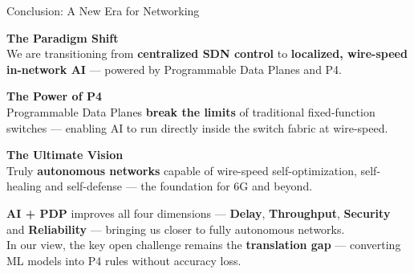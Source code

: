 {
\begin{frame}{Conclusion: A New Era for Networking}
  \vspace{6pt}

  \begin{tcolorbox}[problemcard=HUAdark]
    {\color{HUAdark}\bfseries\small The Paradigm Shift}
    \vspace{3pt}\\
    {\footnotesize\color{HUAdark}
      We are transitioning from \textbf{centralized SDN control}
      to \textbf{localized, wire-speed in-network AI} ---
      powered by Programmable Data Planes and P4.}
  \end{tcolorbox}

  \vspace{6pt}

  \begin{tcolorbox}[problemcard=HUAdark]
    {\color{HUAdark}\bfseries\small The Power of P4}
    \vspace{3pt}\\
    {\footnotesize\color{HUAdark}
      Programmable Data Planes \textbf{break the limits}
      of traditional fixed-function switches ---
      enabling AI to run directly inside the switch fabric
      at wire-speed.}
  \end{tcolorbox}

  \vspace{6pt}

  \begin{tcolorbox}[problemcard=HUAdark]
    {\color{HUAdark}\bfseries\small The Ultimate Vision}
    \vspace{3pt}\\
    {\footnotesize\color{HUAdark}
      Truly \textbf{autonomous networks} capable of
      wire-speed self-optimization, self-healing and
      self-defense --- the foundation for 6G and beyond.}
  \end{tcolorbox}

  \vspace{8pt}

  \begin{tcolorbox}[
    enhanced, boxrule=0pt,
    colback=HUApale, colframe=HUApale,
    arc=4pt, left=8pt, right=8pt,
    top=4pt, bottom=4pt,
    borderline west={4pt}{0pt}{HUAblue},
  ]
    \centering\footnotesize\color{HUAdark}
    \textbf{AI + PDP} improves all four dimensions ---
    \textcolor{HUAblue}{\bfseries Delay},
    \textcolor{HUAlight}{\bfseries Throughput},
    \textcolor{problemred}{\bfseries Security} and
    \textcolor{solutiongreen}{\bfseries Reliability} ---
    bringing us closer to fully autonomous networks.\\[4pt]
    In our view, the key open challenge remains the
    \textbf{translation gap} --- converting ML models
    into P4 rules without accuracy loss.
  \end{tcolorbox}

\end{frame}
}